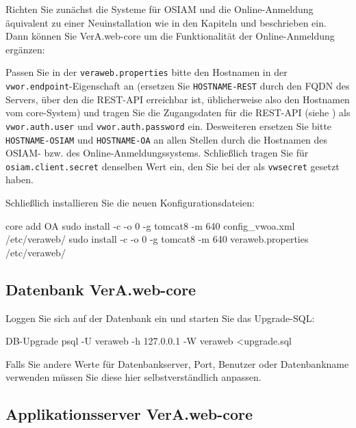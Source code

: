 \documentclass{tarentanleitung}
\begin{document}
Richten Sie zunächst die Systeme für OSIAM und die Online-Anmeldung
äquivalent zu einer Neuinstallation \dash wie in den Kapiteln
 und  beschrieben
\dash ein. Dann können Sie VerA.web-core um die Funktionalität der
Online-Anmeldung ergänzen:

Passen Sie in der \texttt{veraweb.properties} bitte den Hostnamen
in der \texttt{vwor.endpoint}-Eigenschaft an (ersetzen Sie
\texttt{HOSTNAME-REST} durch den FQDN des Servers, über den die
REST-API erreichbar ist, üblicherweise also den Hostnamen vom
core-System) und tragen Sie die Zugangsdaten für die REST-API
(siehe ) als \texttt{vwor.auth.user}
und \texttt{vwor.auth.password} ein.
Desweiteren ersetzen Sie bitte \texttt{HOSTNAME-OSIAM} und
\texttt{HOSTNAME-OA} an allen Stellen durch die Hostnamen
des OSIAM- bzw. des Online-Anmeldungssystems. Schließlich
tragen Sie für \texttt{osiam.client.secret} denselben Wert
ein, den Sie bei der 
als \texttt{vwsecret} gesetzt haben.

\begin{minipage}{\linewidth}
Schließlich installieren Sie die neuen Konfigurationsdateien:

\begin{lstdump}{core add OA}
sudo install -c -o 0 -g tomcat8 -m 640 config_vwoa.xml /etc/veraweb/
sudo install -c -o 0 -g tomcat8 -m 640 veraweb.properties /etc/veraweb/
\end{lstdump}
\end{minipage}

\fi%

\subsection{Datenbank VerA.web-core}\label{subsec:upgrade-core-db}

\begin{minipage}{\linewidth}
Loggen Sie sich auf der Datenbank ein und starten Sie das Upgrade-SQL:

\begin{lstdump}{DB-Upgrade}
psql -U veraweb -h 127.0.0.1 -W veraweb <upgrade.sql
\end{lstdump}

Falls Sie andere Werte für Datenbankserver, Port, Benutzer oder Datenbankname
verwenden müssen Sie diese hier selbstverständlich anpassen.
\end{minipage}

\subsection{Applikationsserver VerA.web-core}\label{subsec:upgrade-core-tomcat}
\end{document}
